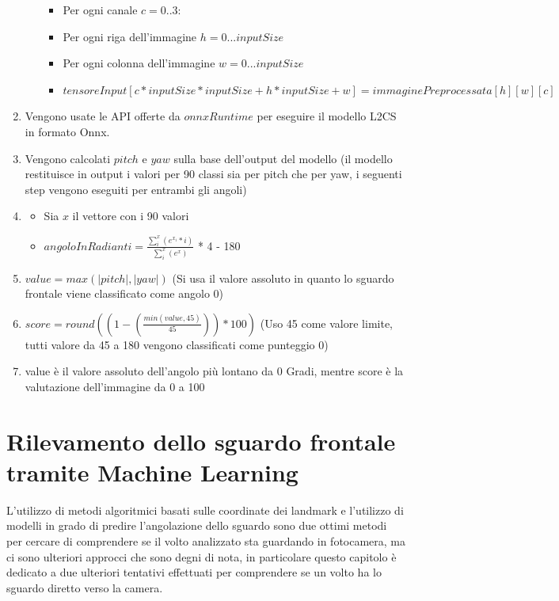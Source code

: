 \documentclass[12pt,a4paper,openright,twoside]{book}
\begin{document}
\begin{enumerate}
\begin{itemize}
\begin{itemize}
            \item Per ogni canale \(c = 0..3\): 
            \item Per ogni riga dell'immagine \(h = 0...inputSize\) 
            \item Per ogni colonna dell'immagine \(w = 0...inputSize\) 
            \item \(tensoreInput[c * inputSize * inputSize + h * inputSize + w] = immaginePreprocessata[h][w][c]\)
        \end{itemize}
    \end{itemize}
    \item Vengono usate le API offerte da \(onnxRuntime\) per eseguire il modello L2CS in formato Onnx. 
    \item Vengono calcolati \(pitch\) e \(yaw\) sulla base dell'output del modello (il modello restituisce in output i valori per 90 classi sia per pitch che per yaw, i seguenti step vengono eseguiti per entrambi gli angoli) 
    \item \begin{itemize} 
        \item Sia \(x\) il vettore con i 90 valori
        \item \(angoloInRadianti = \frac{\sum_{i}^{x} (e^{x_i}*i)}{\sum_i^{x}(e^x)}\) * 4 - 180
    \end{itemize}
    \item \( value = max(|pitch|, |yaw|) \) (Si usa il valore assoluto in quanto lo sguardo frontale viene classificato come angolo 0)
    \item \( score = round((1 - (\frac{min(value, 45)}{45}))*100) \) (Uso 45 come valore limite, tutti valore da 45 a 180 vengono classificati come punteggio 0)
    \item value è il valore assoluto dell'angolo più lontano da 0 Gradi, mentre score è la valutazione dell'immagine da 0 a 100
\end{enumerate}

\chapter{Rilevamento dello sguardo frontale tramite Machine Learning}
\label{chap:frontal_gaze_with_ml}
L'utilizzo di metodi algoritmici basati sulle coordinate dei landmark e l'utilizzo di modelli in grado di predire l'angolazione dello sguardo sono due ottimi metodi per cercare di comprendere se il volto analizzato sta guardando in fotocamera, ma ci sono ulteriori approcci che sono degni di nota, in particolare questo capitolo è dedicato a due ulteriori tentativi effettuati per comprendere se un volto ha lo sguardo diretto verso la camera.
\end{document}
